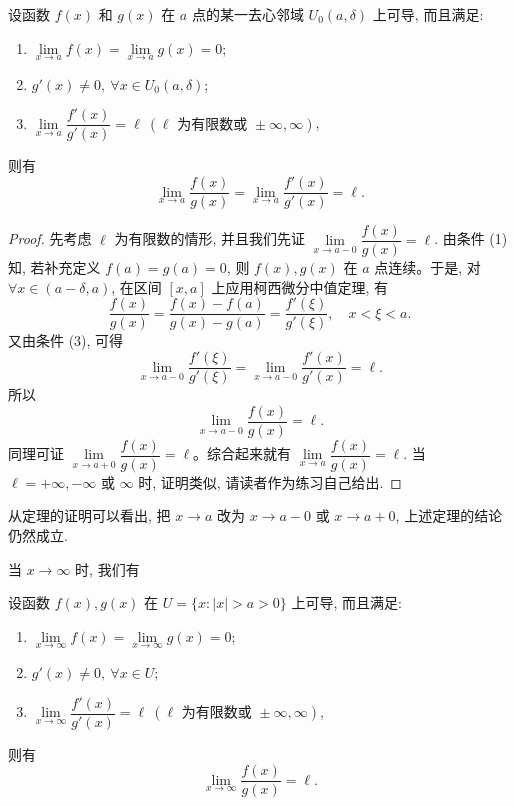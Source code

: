 \begin{theorem}\label{theorem:ma-5-2-1}
设函数 $f(x)$ 和 $g(x)$ 在 $a$ 点的某一去心邻域 $U_0(a,\delta)$ 上可导, 而且满足:
\begin{enumerate}
  \item $\lim\limits_{x\to a}f(x)=\lim\limits_{x\to a}g(x)=0$;
  \item $g'(x)\ne0,\ \forall x\in U_0(a,\delta)$;
  \item $\lim\limits_{x\to a}\dfrac{f'(x)}{g'(x)}=\ell\ (\ell\text{ 为有限数或 }\pm\infty,\infty)$,
\end{enumerate}
则有
\[
  \lim_{x\to a}\frac{f(x)}{g(x)}
  =
  \lim_{x\to a}\frac{f'(x)}{g'(x)}
  =
  \ell.
\]
\end{theorem}


\begin{proof}
先考虑 $\ell$ 为有限数的情形, 并且我们先证 $\lim\limits_{x\to a-0}\dfrac{f(x)}{g(x)}=\ell$.
由条件 (1) 知, 若补充定义 $f(a)=g(a)=0$, 则 $f(x),g(x)$ 在 $a$ 点连续。于是, 对 $\forall x\in(a-\delta,a)$, 在区间 $[x,a]$ 上应用柯西微分中值定理, 有
\[
  \frac{f(x)}{g(x)}
  =
  \frac{f(x)-f(a)}{g(x)-g(a)}
  =
  \frac{f'(\xi)}{g'(\xi)},\quad x<\xi<a.
\]
又由条件 (3), 可得
\[
  \lim_{x\to a-0}\frac{f'(\xi)}{g'(\xi)}
  =
  \lim_{x\to a-0}\frac{f'(x)}{g'(x)}
  =
  \ell.
\]
所以
\[
  \lim_{x\to a-0}\frac{f(x)}{g(x)}=\ell.
\]
同理可证 $\lim\limits_{x\to a+0}\dfrac{f(x)}{g(x)}=\ell$。综合起来就有 $\lim\limits_{x\to a}\dfrac{f(x)}{g(x)}=\ell$.
当 $\ell=+\infty,-\infty$ 或 $\infty$ 时, 证明类似, 请读者作为练习自己给出.
\end{proof}


\begin{remark}\label{remark:ma-5-source-34}
从定理的证明可以看出, 把 $x\to a$ 改为 $x\to a-0$ 或 $x\to a+0$, 上述定理的结论仍然成立.
\end{remark}

当 $x\to\infty$ 时, 我们有

\begin{theorem}\label{theorem:ma-5-2-2}
设函数 $f(x),g(x)$ 在 $U=\{x: |x|>a>0\}$ 上可导, 而且满足:
\begin{enumerate}
  \item $\lim\limits_{x\to\infty}f(x)=\lim\limits_{x\to\infty}g(x)=0$;
  \item $g'(x)\ne0,\ \forall x\in U$;
  \item $\lim\limits_{x\to\infty}\dfrac{f'(x)}{g'(x)}=\ell\ (\ell\text{ 为有限数或 }\pm\infty,\infty)$,
\end{enumerate}
则有
\[
  \lim_{x\to\infty}\frac{f(x)}{g(x)}=\ell.
\]
\end{theorem}


